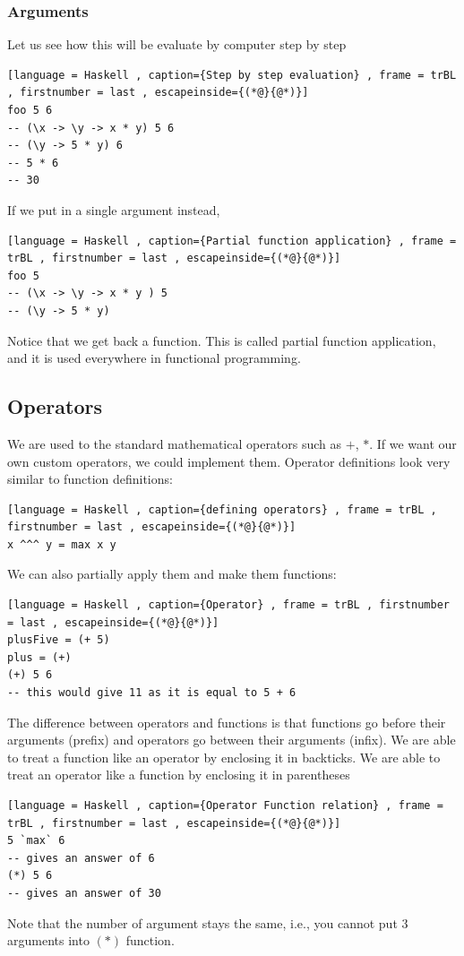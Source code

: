 \documentclass[a4paper]{article}
\theoremstyle{plain}
\theoremstyle{definition}
\theoremstyle{remark}
\begin{document}
\subsubsection{Arguments}

Let us see how this will be evaluate by computer step by step
\begin{lstlisting}[language = Haskell , caption={Step by step evaluation} , frame = trBL , firstnumber = last , escapeinside={(*@}{@*)}]
foo 5 6
-- (\x -> \y -> x * y) 5 6
-- (\y -> 5 * y) 6
-- 5 * 6
-- 30
\end{lstlisting}
If we put in a single argument instead,
\begin{lstlisting}[language = Haskell , caption={Partial function application} , frame = trBL , firstnumber = last , escapeinside={(*@}{@*)}]
foo 5
-- (\x -> \y -> x * y ) 5
-- (\y -> 5 * y)
\end{lstlisting}
Notice that we get back a function. This is called partial function application, and it is used everywhere in functional programming.
\subsection{Operators}
We are used to the standard mathematical operators such as $+$, $*$. If we want our own custom operators, we could implement them. Operator definitions look very similar to function definitions:
\begin{lstlisting}[language = Haskell , caption={defining operators} , frame = trBL , firstnumber = last , escapeinside={(*@}{@*)}]
x ^^^ y = max x y
\end{lstlisting}
We can also partially apply them and make them functions:
\begin{lstlisting}[language = Haskell , caption={Operator} , frame = trBL , firstnumber = last , escapeinside={(*@}{@*)}]
plusFive = (+ 5)
plus = (+)
(+) 5 6 
-- this would give 11 as it is equal to 5 + 6
\end{lstlisting}
The difference between operators and functions is that functions go before their arguments (prefix) and operators go between their arguments (infix). We are able to treat a function like an operator by enclosing it in backticks. We are able to treat an operator like a function by enclosing it in parentheses
\begin{lstlisting}[language = Haskell , caption={Operator Function relation} , frame = trBL , firstnumber = last , escapeinside={(*@}{@*)}]
5 `max` 6
-- gives an answer of 6
(*) 5 6
-- gives an answer of 30
\end{lstlisting}
Note that the number of argument stays the same, i.e., you cannot put 3 arguments into $(*)$ function.
\end{document}
